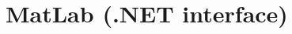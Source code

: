 %	
%	
%	
%	
%	
%	
%	
%	
%	
%	
%	
%	
%	
%	
%	
	
	
	\newpage
	\section{MatLab (.NET interface)}
	\label{MatLabNET}
	
